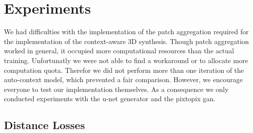 \section{Experiments}

We had difficulties with the implementation of the patch aggregation required
for the implementation of the context-aware 3D synthesis. Though patch
aggregation worked in general, it occupied more computational resources than
the actual training. Unfortunatly we were not able to find a workaround or to
allocate more computation quota. Therefor we did not perform more than one
iteration of the auto-context model, which prevented a fair comparison.
However, we encourage everyone to test our implementation themselves.
As a consequence we only conducted experiments with the u-net generator and
the pixtopix \gls{gan}.

\subsection{Distance Losses}

